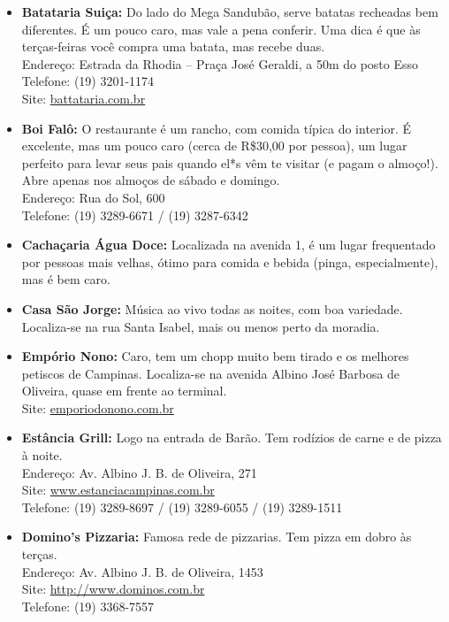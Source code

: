 \begin{itemize}
    \item   \textbf{Batataria Suiça:} Do lado do Mega Sandubão, serve batatas
        recheadas bem diferentes. É um pouco caro, mas vale a pena conferir. Uma
        dica é que às terças-feiras você compra uma batata, mas recebe duas.
        \\Endereço: Estrada da Rhodia -- Praça José Geraldi, a 50m do posto Esso
        \\Telefone: (19) 3201-1174
        \\Site: \url{battataria.com.br}

    \item   \textbf{Boi Falô:} O restaurante é um rancho, com comida típica do
        interior. É excelente, mas um pouco caro (cerca de R\$30,00 por pessoa),
        um lugar perfeito para levar seus pais quando el*s vêm te visitar (e
        pagam o almoço!). Abre apenas nos almoços de sábado e domingo.
        \\Endereço: Rua do Sol, 600
        \\Telefone: (19) 3289-6671 / (19) 3287-6342%

    \item   \textbf{Cachaçaria Água Doce:} Localizada na avenida 1, é um lugar
        frequentado por pessoas mais velhas, ótimo para comida e bebida (pinga,
        especialmente), mas é bem caro.

    \item   \textbf{Casa São Jorge:} Música ao vivo todas as noites, com boa
        variedade. Localiza-se na rua Santa Isabel, mais ou menos perto da
        moradia.

    \item   \textbf{Empório Nono:} Caro, tem um chopp muito bem tirado e os
        melhores petiscos de Campinas. Localiza-se na avenida Albino José
        Barbosa de Oliveira, quase em frente ao terminal.
        \\Site: \url{emporiodonono.com.br}

    \item   \textbf{Estância Grill:} Logo na entrada de Barão. Tem rodízios de
        carne e de pizza à noite.
        \\Endereço: Av. Albino J. B. de Oliveira, 271
        \\Site: \url{www.estanciacampinas.com.br}
        \\Telefone: (19) 3289-8697 / (19) 3289-6055 / (19) 3289-1511

    \item   \textbf{Domino's Pizzaria:} Famosa rede de pizzarias. Tem pizza
        em dobro às terças.
        \\Endereço: Av. Albino J. B. de Oliveira, 1453
        \\Site: \url{http://www.dominos.com.br}
        \\Telefone: (19) 3368-7557


\end{itemize}
